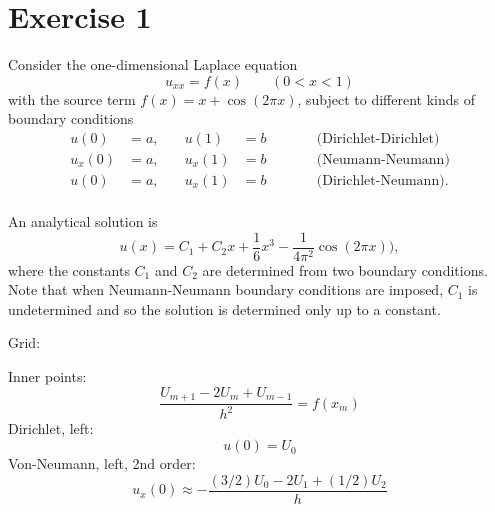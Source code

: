 \section{Exercise 1}

Consider the one-dimensional Laplace equation
\begin{equation*}
u_{xx} = f(x) \qquad (0 < x < 1)
\end{equation*}
with the source term $f(x) = x + \cos(2 \pi x)$, subject to different kinds of boundary conditions
\begin{equation*}
\begin{aligned}
u(0) &= a, &\quad u(1) &= b &\qquad& \text{(Dirichlet-Dirichlet)} \\
u_x(0) &= a, &\quad u_x(1) &= b &\qquad& \text{(Neumann-Neumann)} \\
u(0) &= a, &\quad u_x(1) &= b &\qquad& \text{(Dirichlet-Neumann)}. \\
\end{aligned}
\end{equation*}

An analytical solution is
\begin{equation*}
u(x) = C_1 + C_2 x + \frac{1}{6}x^3 - \frac{1}{4 \pi^2}\cos(2 \pi x)),
\end{equation*}
where the constants $C_1$ and $C_2$ are determined from two boundary conditions.
Note that when Neumann-Neumann boundary conditions are imposed, $C_1$ is undetermined and so the solution is determined only up to a constant.

Grid:
\begin{center}
\end{center}

Inner points:
\begin{equation*}
\frac{U_{m+1} - 2 U_m + U_{m-1}}{h^2} = f(x_m)
\end{equation*}
Dirichlet, left:
\begin{equation*}
u(0) = U_0
\end{equation*}
Von-Neumann, left, 2nd order:
\begin{equation*}
u_x(0) \approx -\frac{(3/2)U_0 -2U_1 + (1/2)U_2}{h}
\end{equation*}


